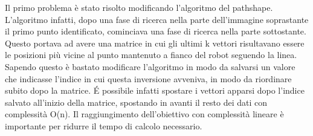 Il primo problema è stato risolto modificando l'algoritmo del pathshape. L'algoritmo infatti, dopo una fase di ricerca nella parte dell'immagine soprastante il primo punto identificato, cominciava una fase di ricerca nella parte sottostante. Questo portava ad avere una matrice in cui gli ultimi k vettori risultavano essere le posizioni più vicine al punto mantenuto a fianco del robot seguendo la linea. Sapendo questo è bastato modificare l'algoritmo in modo da salvarsi un valore che indicasse l'indice in cui questa inversione avveniva, in modo da riordinare subito dopo la matrice. \'E possibile infatti spostare i vettori apparsi dopo l'indice salvato all'inizio della matrice, spostando in avanti il resto dei dati con complessità O(n). Il raggiungimento dell'obiettivo con complessità lineare è importante per ridurre il tempo di calcolo necessario.

